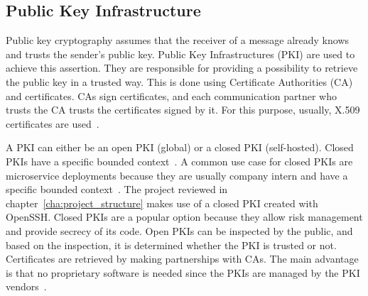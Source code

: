 \subsection{Public Key Infrastructure} \label{sec:pki}
Public key cryptography assumes that the receiver of a message already knows and trusts the sender's public key.
Public Key Infrastructures (PKI) are used to achieve this assertion.
They are responsible for providing a possibility to retrieve the public key in a trusted way.
This is done using Certificate Authorities (CA) and certificates.
CAs sign certificates, and each communication partner who trusts the CA trusts the certificates signed by it.
For this purpose, usually, X.509 certificates are used~\cite{anderson2020security}.

A PKI can either be an open PKI (global) or a closed PKI (self-hosted).
Closed PKIs have a specific bounded context~\cite{hlavaty2003risk}.
A common use case for closed PKIs are microservice deployments because they are usually company intern and have a specific bounded context~\cite{dias2020microservices}.
The project reviewed in chapter~\ref{cha:project_structure} makes use of a closed PKI created with OpenSSH.
Closed PKIs are a popular option because they allow risk management and provide secrecy of its code.
Open PKIs can be inspected by the public, and based on the inspection, it is determined whether the PKI is trusted or not.
Certificates are retrieved by making partnerships with CAs.
The main advantage is that no proprietary software is needed since the PKIs are managed by the PKI vendors~\cite{hlavaty2003risk}.


